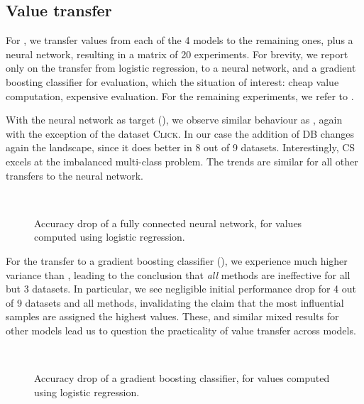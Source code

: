 \documentclass[10pt]{article}
\newcommand{\tmem}[1]{{\em #1\/}}
\newcommand{\tmname}[1]{\textsc{#1}}
\begin{document}
\subsection{Value transfer}\label{sec:value-transfer}

For , we transfer values from each of the 4
models to the remaining ones, plus a neural network, resulting in a matrix of
20 experiments. For brevity, we report only on the transfer from logistic
regression, to a neural network, and a gradient boosting classifier for
evaluation, which the situation of interest: cheap value computation,
expensive evaluation. For the remaining experiments, we refer to
.

With the neural network as target (), we observe
similar behaviour as {\cite{schoch_csshapley_2022}}, again with the exception
of the dataset {\tmname{Click}}. In our case the addition of DB changes again
the landscape, since it does better in 8 out of 9 datasets. Interestingly, CS
excels at the imbalanced multi-class problem. The trends are similar for all
other transfers to the neural network.

\begin{figure}[h]
  \
  \caption{\label{fig:transfer-lr-mlp}Accuracy drop of a fully connected
  neural network, for values computed using logistic regression.}
\end{figure}

For the transfer to a gradient boosting classifier
(), we experience much higher variance than
{\cite{schoch_csshapley_2022}}, leading to the conclusion that {\tmem{all}}
methods are ineffective for all but 3 datasets. In particular, we see
negligible initial performance drop for 4 out of 9 datasets and all methods,
invalidating the claim that the most influential samples are assigned the
highest values. These, and similar mixed results for other models lead us to
question the practicality of value transfer across models.

\begin{figure}[h]
  \
  \caption{\label{fig:transfer-lr-gb}Accuracy drop of a gradient boosting
  classifier, for values computed using logistic regression.}
\end{figure}
\end{document}
